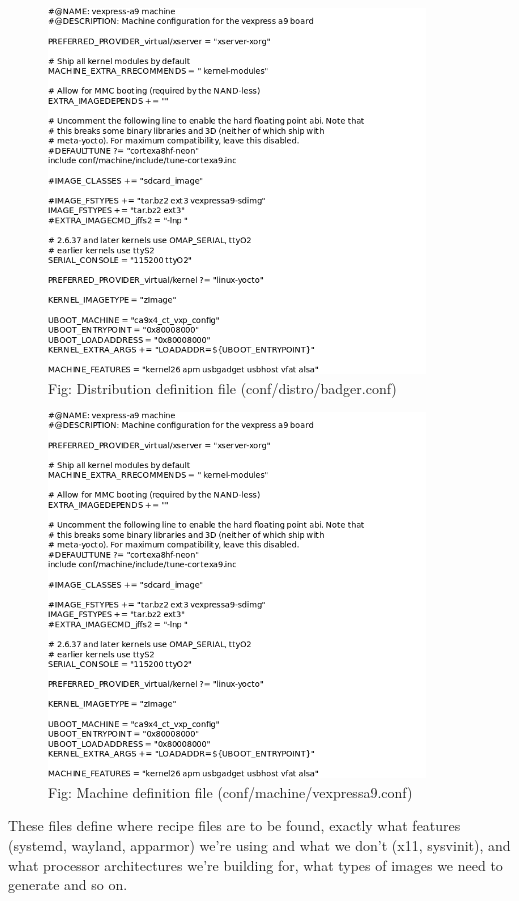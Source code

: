 \documentclass[10pt, a5paper]{article}
\begin{document}
\begin{figure}[h!]
  \centering
  \includegraphics[width=10cm]{w_07_2016_Shadura7.png}
  \caption* {Fig: Distribution definition file (conf/distro/badger.conf)}
\end{figure}

\begin{figure}[h!]
  \centering
  \includegraphics[width=10cm]{w_07_2016_Shadura8.png}
  \caption* {Fig: Machine definition file (conf/machine/vexpressa9.conf)}
\end{figure}


These files define where recipe files are to be found, exactly what features (systemd, wayland, apparmor) we're using and what we don't (x11, sysvinit), and what processor architectures we're building for, what types of images we need to generate and so on.
\end{document}
